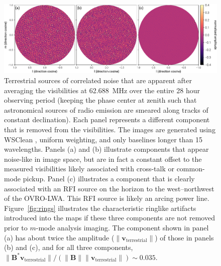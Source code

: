 \documentclass[twocolumn]{aastex61}
\renewcommand{\b}{\pmb}
\begin{document}
\begin{figure}[t]
    \includegraphics[width=\textwidth]{figures/terrestrial-interference/smeared}
    \caption{
        Terrestrial sources of correlated noise that are apparent after averaging the visibilities
        at 62.688~MHz over the entire 28 hour observing period (keeping the phase center at zenith
        such that astronomical sources of radio emission are smeared along tracks of constant
        declination). Each panel represents a different component that is removed from the
        visibilities. The images are generated using WSClean \citep{2014MNRAS.444..606O}, uniform
        weighting, and only baselines longer than 15 wavelengths. Panels (a) and (b) illustrate
        components that appear noise-like in image space, but are in fact a constant offset to the
        measured visibilities likely associated with cross-talk or common-mode pickup. Panel (c)
        illustrates a component that is clearly associated with an RFI source on the horizon to the
        west--northwest of the OVRO-LWA. This RFI source is likely an arcing power line.
        Figure~\ref{fig:rings} illustrates the characteristic ringlike artifacts introduced into the
        maps if these three components are not removed prior to $m$-mode analysis imaging. The
        component shown in panel (a) has about twice the amplitude ($\|\b v_\text{terrestrial}\|$)
        of those in panels (b) and (c), and for all three components, $\|\b B^*\b
        v_\text{terrestrial}\|/(\|\b B\|\|\b v_\text{terrestrial}\|) \sim 0.035$.
    }
    \label{fig:fitrfi}
\end{figure}
\end{document}
